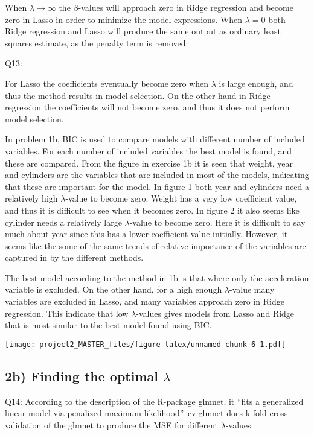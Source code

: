 \documentclass[]{article}
\begin{document}
When \(\lambda \rightarrow \infty\) the \(\beta\)-values will approach
zero in Ridge regression and become zero in Lasso in order to minimize
the model expressions. When \(\lambda = 0\) both Ridge regression and
Lasso will produce the same output as ordinary least squares estimate,
as the penalty term is removed.

Q13:

For Lasso the coefficients eventually become zero when \(\lambda\) is
large enough, and thus the method results in model selection. On the
other hand in Ridge regression the coefficients will not become zero,
and thus it does not perform model selection.

In problem 1b, BIC is used to compare models with different number of
included variables. For each number of included variables the best model
is found, and these are compared. From the figure in exercise 1b it is
seen that weight, year and cylinders are the variables that are included
in most of the models, indicating that these are important for the
model. In figure 1 both year and cylinders need a relatively high
\(\lambda\)-value to become zero. Weight has a very low coefficient
value, and thus it is difficult to see when it becomes zero. In figure 2
it also seems like cylinder needs a relatively large \(\lambda\)-value
to become zero. Here it is difficult to say much about year since this
has a lower coefficient value initially. However, it seems like the some
of the same trends of relative importance of the variables are captured
in by the different methods.

The best model according to the method in 1b is that where only the
acceleration variable is excluded. On the other hand, for a high enough
\(\lambda\)-value many variables are excluded in Lasso, and many
variables approach zero in Ridge regression. This indicate that low
\(\lambda\)-values gives models from Lasso and Ridge that is most
similar to the best model found using BIC.

\texttt{[image: project2\_MASTER\_files/figure-latex/unnamed-chunk-6-1.pdf]}

\subsection{\texorpdfstring{2b) Finding the optimal
\(\lambda\)}{2b) Finding the optimal \textbackslash{}lambda}}\label{b-finding-the-optimal-lambda}

Q14: According to the description of the R-package glmnet, it ``fits a
generalized linear model via penalized maximum likelihood''. cv.glmnet
does k-fold cross-validation of the glmnet to produce the MSE for
different \(\lambda\)-values.
\end{document}
